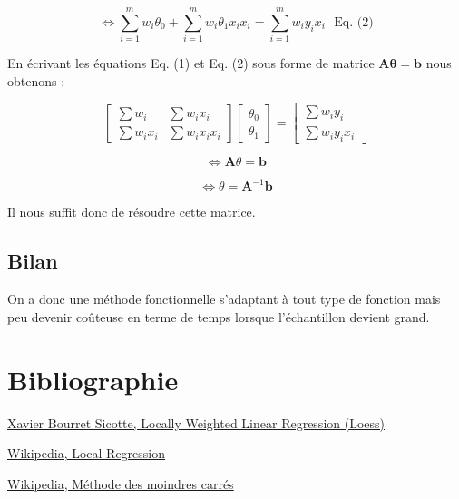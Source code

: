 \documentclass[a4paper,12pt]{article} %
\begin{document}
\[\iff \sum_{i=1}^m w_i  \theta_0 + \sum_{i=1}^m w_i  \theta_1 x_i x_i  = \sum_{i=1}^m w_i y_i  x_i \ \ \ \text{Eq. (2)}\]


En écrivant les équations  Eq. (1) et Eq. (2) sous forme de matrice $\mathbf{A \theta = b}$ nous obtenons :



    \[\begin{bmatrix} \sum w_i & \sum w_i x_i \\ \sum w_i x_i & \sum w_i x_i x_i \end{bmatrix}  \begin{bmatrix} \theta_0 \\ \theta_1 \end{bmatrix}   = \begin{bmatrix}  \sum w_i y_i \\  \sum w_i y_i x_i \end{bmatrix}\] 

    \[\iff \mathbf{A} \theta = \mathbf{b}\]

    \[\iff \theta = \mathbf{A}^{-1} \mathbf{b}\]

Il nous suffit donc de résoudre cette matrice.

\subsection{Bilan}

On a donc une méthode fonctionnelle s'adaptant à tout type de fonction mais peu devenir coûteuse en terme de temps lorsque l'échantillon devient grand.


\section{Bibliographie}

\href{https://xavierbourretsicotte.github.io/loess.html}{Xavier Bourret Sicotte, Locally Weighted Linear Regression (Loess)}

\href{https://en.wikipedia.org/wiki/Local_regression}{Wikipedia, Local Regression}

\href{https://fr.wikipedia.org/wiki/Méthode_des_moindres_carrés}{Wikipedia, Méthode des moindres carrés}
     
\end{document}
